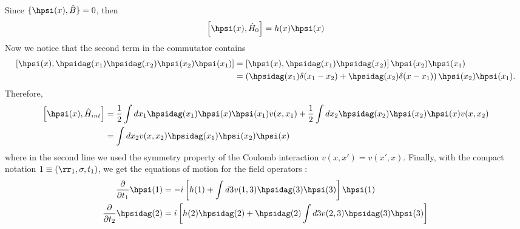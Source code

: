 Since $\{\hpsi(x),\hat{B}\} = 0$, then 
\begin{equation}
	\left[ \hpsi(x),\hat{H}_0\right] = h(x) \hpsi(x)
\end{equation}
Now we notice that the second term in the commutator contains 
\begin{align}
\begin{split}
	\left[ \hpsi(x), \hpsidag(x_1)\hpsidag(x_2)\hpsi(x_2)\hpsi(x_1) \right] &= \left[ \hpsi(x),\hpsidag(x_1)\hpsidag(x_2) \right] \hpsi(x_2)\hpsi(x_1) \\
	&= \left( \hpsidag(x_1) \delta(x_1-x_2) + \hpsidag(x_2)\delta(x-x_1) \right) \hpsi(x_2)\hpsi(x_1).
\end{split}
\end{align}
Therefore, 
\begin{align}
\begin{split}
	\left[ \hpsi(x),\hat{H}_{int} \right] &= \frac{1}{2} \int dx_1 \hpsidag(x_1)\hpsi(x)\hpsi(x_1) v(x,x_1) + \frac{1}{2} \int dx_2 \hpsidag(x_2)\hpsi(x_2)\hpsi(x) v(x,x_2) \\
	&= \int dx_2 v(x,x_2) \hpsidag(x_1) \hpsi(x_2) \hpsi(x)
\end{split}
\end{align}
where in the second line we used the symmetry property of the Coulomb interaction $v(x,x') = v(x',x)$.
Finally, with the compact notation $1 \equiv (\rr_1, \sigma, t_1)$, we get the equations of motion for the field operators :
\begin{align}
\begin{split}
	\frac{\partial}{\partial t_1} \hpsi(1) &= -i \left[ h(1) + \int d3 v(1,3) \hpsidag(3)\hpsi(3) \right] \hpsi(1) \\
	\frac{\partial}{\partial t_2} \hpsidag(2) &= i \left[ h(2)\hpsidag(2) + \hpsidag(2) \int d3 v(2,3) \hpsidag(3)\hpsi(3) \right]
\end{split}
\end{align}






